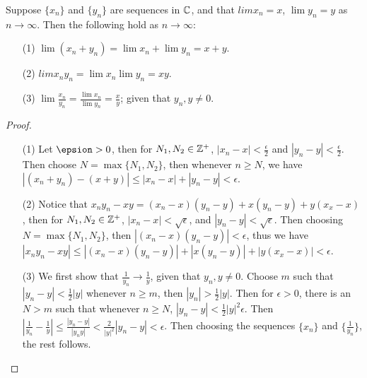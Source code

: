 \begin{theorem}\label{3.1.2}
    Suppose $\{x_n\}$ and  $\{y_n\}$ are sequences in  $\mathbb{C}$, and that  $lim{x_n}=x$,
    $\lim{y_n}=y$ as  $n \rightarrow \infty$. Then the following hold as  $n \rightarrow \infty$:
         \begin{enumerate}
             \item[(1)] $\lim{(x_n+y_n)}=\lim{x_n}+\lim{y_n}=x+y$.

             \item[(2)] $lim{x_ny_n}=\lim{x_n}\lim{y_n}=xy$.

             \item[(3)] $\lim{\frac{x_n}{y_n}}=\frac{\lim{x_n}}{\lim{y_n}}=\frac{x}{y}$;
                 given that $y_n, y \neq 0$.
        \end{enumerate}
\end{theorem}
\begin{proof}
    \begin{enumerate}
        \item[(1)] Let $\epsion>0$, then for  $N_1, N_2 \in \mathbb{Z}^+$, $|x_n-x|<\frac{\epsilon}{2}$ and
            $|y_n-y|<\frac{\epsilon}{2}$. Then choose $N=\max\{N_1,N_2\}$, then whenever $n \geq N$,
            we have  $|(x_n+y_n)-(x+y)| \leq |x_n-x|+|y_n-y|<\epsilon$.

        \item[(2)] Notice that $x_ny_n-xy=(x_n-x)(y_n-y)+x(y_n-y)+y(x_x-x)$, then for
            $N_1,N_2 \in \mathbb{Z}^+$, $|x_n-x|<\sqrt{\epsilon}$, and  $|y_n-y|<\sqrt{\epsilon}$. Then
            choosing  $N=\max\{N_1,N_2\}$, then $|(x_n-x)(y_n-y)|<\epsilon$, thus
            we have $|x_ny_n-xy|\leq |(x_n-x)(y_n-y)|+|x(y_n-y)|+|y(x_x-x)|<\epsilon$.

        \item[(3)] We first show that $\frac{1}{y_n} \rightarrow \frac{1}{y}$, given that $y_n,y \neq 0$.
            Choose  $m$ such that  $|y_n-y|<\frac{1}{2}|y|$ whenever $n \geq m$, then
            $|y_n|>\frac{1}{2}|y|$. Then for $\epsilon>0$, there is an  $N>m$ such that whenever  $n \geq N$,
             $|y_n-y|<\frac{1}{2}|y|^2\epsilon$. Then $|\frac{1}{y_n}-\frac{1}{y}| \leq
             \frac{|y_n-y|}{|y_ny|}<\frac{2}{|y|^2}|y_n-y|<\epsilon$. Then choosing the sequences
             $\{x_n\}$ and  $\{\frac{1}{y_n}\}$, the rest follows.
    \end{enumerate}
\end{proof}

